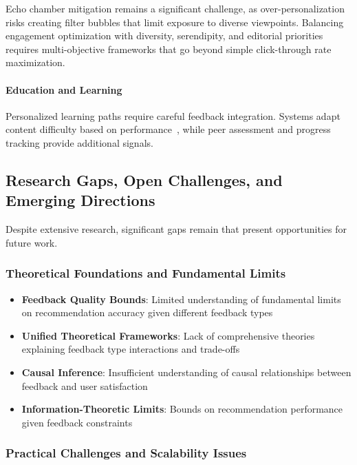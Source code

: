 Echo chamber mitigation remains a significant challenge, as over-personalization risks creating filter bubbles that limit exposure to diverse viewpoints. Balancing engagement optimization with diversity, serendipity, and editorial priorities requires multi-objective frameworks that go beyond simple click-through rate maximization.

\paragraph{Education and Learning}
Personalized learning paths require careful feedback integration. Systems adapt content difficulty based on performance~\cite{tang2019towards}, while peer assessment and progress tracking provide additional signals.

\subsection{Research Gaps, Open Challenges, and Emerging Directions}

Despite extensive research, significant gaps remain that present opportunities for future work.

\subsubsection{Theoretical Foundations and Fundamental Limits}

\begin{itemize}
    \item \textbf{Feedback Quality Bounds}: Limited understanding of fundamental limits on recommendation accuracy given different feedback types
    \item \textbf{Unified Theoretical Frameworks}: Lack of comprehensive theories explaining feedback type interactions and trade-offs
    \item \textbf{Causal Inference}: Insufficient understanding of causal relationships between feedback and user satisfaction
    \item \textbf{Information-Theoretic Limits}: Bounds on recommendation performance given feedback constraints
\end{itemize}

\subsubsection{Practical Challenges and Scalability Issues}

